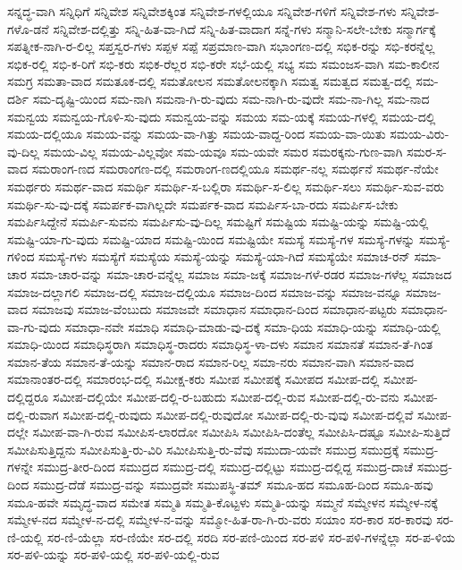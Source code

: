 {ಸನ್ನದ್ಧ-ವಾಗಿ
ಸನ್ನಿಧಿಗೆ
ಸನ್ನಿವೇಶ
ಸನ್ನಿವೇಶಕ್ಕಿಂತ
ಸನ್ನಿವೇಶ-ಗಳಲ್ಲಿಯೂ
ಸನ್ನಿವೇಶ-ಗಳಿಗೆ
ಸನ್ನಿವೇಶ-ಗಳು
ಸನ್ನಿವೇಶ-ಗಳೊ-ಡನೆ
ಸನ್ನಿವೇಶ-ದಲ್ಲಿತ್ತು
ಸನ್ನಿ-ಹಿತ-ವಾ-ಗಿದೆ
ಸನ್ನಿ-ಹಿತ-ವಾದಾಗ
ಸನ್ನೆ-ಗಳು
ಸನ್ಮಾನಿ-ಸಲೇ-ಬೇಕು
ಸನ್ಮಾರ್ಗಕ್ಕೆ
ಸಪತ್ನೀಕ-ನಾಗಿ-ರ-ಲಿಲ್ಲ
ಸಪ್ತಸ್ವರ-ಗಳು
ಸಪ್ಪಳ
ಸಪ್ಪೆ
ಸಪ್ರಮಾಣ-ವಾಗಿ
ಸಭಾಂಗಣ-ದಲ್ಲಿ
ಸಭಿಕ-ರನ್ನು
ಸಭಿ-ಕರನ್ನೆಲ್ಲ
ಸಭಿಕ-ರಲ್ಲಿ
ಸಭಿ-ಕ-ರಿಗೆ
ಸಭಿ-ಕರು
ಸಭಿಕ-ರೆಲ್ಲರ
ಸಭಿ-ಕರೇ
ಸಭೆ-ಯಲ್ಲಿ
ಸಭ್ಯ
ಸಮ
ಸಮಂಜಸ-ವಾಗಿ
ಸಮ-ಕಾಲೀನ
ಸಮಗ್ರ
ಸಮತಾ-ವಾದ
ಸಮತೂಕ-ದಲ್ಲಿ
ಸಮತೋಲನ
ಸಮತೋಲನಕ್ಕಾಗಿ
ಸಮತ್ವ
ಸಮತ್ವದ
ಸಮತ್ವ-ದಲ್ಲಿ
ಸಮ-ದರ್ಶಿ
ಸಮ-ದೃಷ್ಟಿ-ಯಿಂದ
ಸಮ-ನಾಗಿ
ಸಮನಾ-ಗಿ-ರು-ವುದು
ಸಮ-ನಾಗಿ-ರು-ವುದೇ
ಸಮ-ನಾ-ಗಿಲ್ಲ
ಸಮ-ನಾದ
ಸಮನ್ವಯ
ಸಮನ್ವಯ-ಗೊಳಿ-ಸು-ವುದು
ಸಮನ್ವಯ-ವನ್ನು
ಸಮಯ
ಸಮ-ಯಕ್ಕೆ
ಸಮಯ-ಗಳಲ್ಲಿ
ಸಮಯ-ದಲ್ಲಿ
ಸಮಯ-ದಲ್ಲಿಯೂ
ಸಮಯ-ವನ್ನು
ಸಮಯ-ವಾ-ಗಿತ್ತು
ಸಮಯ-ವಾದ್ದ-ರಿಂದ
ಸಮಯ-ವಾ-ಯಿತು
ಸಮಯ-ವಿರು-ವು-ದಿಲ್ಲ
ಸಮಯ-ವಿಲ್ಲ
ಸಮಯ-ವಿಲ್ಲವೋ
ಸಮ-ಯವೂ
ಸಮ-ಯವೇ
ಸಮರ
ಸಮರಕ್ಕನು-ಗುಣ-ವಾಗಿ
ಸಮರ-ಸ-ವಾದ
ಸಮರಾಂಗ-ಣದ
ಸಮರಾಂಗಣ-ದಲ್ಲಿ
ಸಮರಾಂಗ-ಣದಲ್ಲಿಯೂ
ಸಮರ್ಥ-ನಲ್ಲ
ಸಮರ್ಥನೆ
ಸಮರ್ಥ-ನೆಯೇ
ಸಮರ್ಥರು
ಸಮರ್ಥ-ವಾದ
ಸಮರ್ಥಿ
ಸಮರ್ಥಿ-ಸ-ಬಲ್ಲಿರಾ
ಸಮರ್ಥಿ-ಸ-ಲಿಲ್ಲ
ಸಮರ್ಥಿ-ಸಲು
ಸಮರ್ಥಿ-ಸುವ-ವರು
ಸಮರ್ಥಿ-ಸು-ವು-ದಕ್ಕೆ
ಸಮರ್ಪಕ-ವಾಗಿಲ್ಲದೇ
ಸಮರ್ಪಕ-ವಾದ
ಸಮರ್ಪಿಸ-ಬಾ-ರದು
ಸಮರ್ಪಿಸ-ಬೇಕು
ಸಮರ್ಪಿಸಿದ್ದೇನೆ
ಸಮರ್ಪಿ-ಸುವನು
ಸಮರ್ಪಿಸು-ವು-ದಿಲ್ಲ
ಸಮಷ್ಟಿಗೆ
ಸಮಷ್ಟಿಯ
ಸಮಷ್ಟಿ-ಯನ್ನು
ಸಮಷ್ಟಿ-ಯಲ್ಲಿ
ಸಮಷ್ಟಿ-ಯಾ-ಗು-ವುದು
ಸಮಷ್ಟಿ-ಯಾದ
ಸಮಷ್ಟಿ-ಯಿಂದ
ಸಮಷ್ಟಿಯೇ
ಸಮಸ್ಯೆ
ಸಮಸ್ಯೆ-ಗಳ
ಸಮಸ್ಯೆ-ಗಳನ್ನು
ಸಮಸ್ಯೆ-ಗಳಿಂದ
ಸಮಸ್ಯೆ-ಗಳು
ಸಮಸ್ಯೆಗೆ
ಸಮಸ್ಯೆಯ
ಸಮಸ್ಯೆ-ಯನ್ನು
ಸಮಸ್ಯೆ-ಯಾ-ಗಿದೆ
ಸಮಸ್ಯೆಯೇ
ಸಮಾಚ-ರನ್
ಸಮಾ-ಚಾರ
ಸಮಾ-ಚಾರ-ವನ್ನು
ಸಮಾ-ಚಾರ-ವನ್ನೆಲ್ಲ
ಸಮಾಜ
ಸಮಾ-ಜಕ್ಕೆ
ಸಮಾಜ-ಗಳೆ-ರಡರ
ಸಮಾಜ-ಗಳೆಲ್ಲ
ಸಮಾಜದ
ಸಮಾಜ-ದಲ್ಲಾಗಲಿ
ಸಮಾಜ-ದಲ್ಲಿ
ಸಮಾಜ-ದಲ್ಲಿಯೂ
ಸಮಾಜ-ದಿಂದ
ಸಮಾಜ-ವನ್ನು
ಸಮಾಜ-ವನ್ನೂ
ಸಮಾಜ-ವಾದ
ಸಮಾಜವು
ಸಮಾಜ-ವೆಂಬುದು
ಸಮಾಜವೇ
ಸಮಾಧಾನ
ಸಮಾಧಾನ-ದಿಂದ
ಸಮಾಧಾನ-ಪಟ್ಟರು
ಸಮಾಧಾನ-ವಾ-ಗು-ವುದು
ಸಮಾಧಾ-ನವೇ
ಸಮಾಧಿ
ಸಮಾಧಿ-ಮಾಡು-ವು-ದಕ್ಕೆ
ಸಮಾ-ಧಿಯ
ಸಮಾಧಿ-ಯನ್ನು
ಸಮಾಧಿ-ಯಲ್ಲಿ
ಸಮಾಧಿ-ಯಿಂದ
ಸಮಾಧಿಸ್ಥರಾಗಿ
ಸಮಾಧಿಸ್ಥ-ರಾದರು
ಸಮಾಧಿಸ್ಥ-ಳಾ-ದಳು
ಸಮಾನ
ಸಮಾನತೆ
ಸಮಾನ-ತೆ-ಗಿಂತ
ಸಮಾನ-ತೆಯ
ಸಮಾನ-ತೆ-ಯನ್ನು
ಸಮಾನ-ರಾದ
ಸಮಾನ-ರಿಲ್ಲ
ಸಮಾ-ನರು
ಸಮಾನ-ವಾಗಿ
ಸಮಾನ-ವಾದ
ಸಮಾನಾಂತರ-ದಲ್ಲಿ
ಸಮಾರಂಭ-ದಲ್ಲಿ
ಸಮೀಕ್ಷ-ಕರು
ಸಮೀಪ
ಸಮೀಪಕ್ಕೆ
ಸಮೀಪದ
ಸಮೀಪ-ದಲ್ಲಿ
ಸಮೀಪ-ದಲ್ಲಿದ್ದರೂ
ಸಮೀಪ-ದಲ್ಲಿಯೇ
ಸಮೀಪ-ದಲ್ಲಿ-ರ-ಬಹುದು
ಸಮೀಪ-ದಲ್ಲಿ-ರುವ
ಸಮೀಪ-ದಲ್ಲಿ-ರು-ವನು
ಸಮೀಪ-ದಲ್ಲಿ-ರುವಾಗ
ಸಮೀಪ-ದಲ್ಲಿ-ರುವುದು
ಸಮೀಪ-ದಲ್ಲಿ-ರುವುದೋ
ಸಮೀಪ-ದಲ್ಲಿ-ರು-ವುವು
ಸಮೀಪ-ದಲ್ಲಿವೆ
ಸಮೀಪ-ದಲ್ಲೇ
ಸಮೀಪ-ವಾ-ಗಿ-ರುವ
ಸಮೀಪಿಸ-ಲಾರದೋ
ಸಮೀಪಿಸಿ
ಸಮೀಪಿಸಿ-ದಂತೆಲ್ಲ
ಸಮೀಪಿಸಿ-ದಷ್ಟೂ
ಸಮೀಪಿ-ಸುತ್ತಿದೆ
ಸಮೀಪಿಸುತ್ತಿದ್ದನು
ಸಮೀಪಿಸುತ್ತಿ-ರು-ವಿರಿ
ಸಮೀಪಿಸುತ್ತಿ-ರು-ವೆವು
ಸಮುದಾ-ಯವೇ
ಸಮುದ್ರ
ಸಮುದ್ರಕ್ಕೆ
ಸಮುದ್ರ-ಗಳನ್ನೇ
ಸಮುದ್ರ-ತೀರ-ದಿಂದ
ಸಮುದ್ರದ
ಸಮುದ್ರ-ದಲ್ಲಿ
ಸಮುದ್ರ-ದಲ್ಲಿಟ್ಟು
ಸಮುದ್ರ-ದಲ್ಲಿದ್ದ
ಸಮುದ್ರ-ದಾಚೆ
ಸಮುದ್ರ-ದಿಂದ
ಸಮುದ್ರ-ದೆಡೆ
ಸಮುದ್ರ-ವನ್ನು
ಸಮುದ್ರವೇ
ಸಮುಪಸ್ಥಿ-ತಮ್
ಸಮೂ-ಹದ
ಸಮೂಹ-ದಿಂದ
ಸಮೂ-ಹವು
ಸಮೂ-ಹವೇ
ಸಮೃದ್ಧ-ವಾದ
ಸಮೇತ
ಸಮ್ಮತಿ
ಸಮ್ಮತಿ-ಕೊಟ್ಟಳು
ಸಮ್ಮತಿ-ಯನ್ನು
ಸಮ್ಮನೆ
ಸಮ್ಮೇಳನ
ಸಮ್ಮೇಳ-ನಕ್ಕೆ
ಸಮ್ಮೇಳ-ನದ
ಸಮ್ಮೇಳ-ನ-ದಲ್ಲಿ
ಸಮ್ಮೇಳ-ನ-ವನ್ನು
ಸಮ್ಮೋ-ಹಿತ-ರಾ-ಗಿ-ರು-ವರು
ಸಯಾಂ
ಸರ-ಕಾರ
ಸರ-ಕಾರವು
ಸರ-ಣಿ-ಯಲ್ಲಿ
ಸರ-ಣಿ-ಯೆಲ್ಲಾ
ಸರ-ಣಿಯೇ
ಸರ-ದಲ್ಲಿ
ಸರದಿ
ಸರ-ಪಣಿ-ಯಿಂದ
ಸರ-ಪಳಿ
ಸರ-ಪಳಿ-ಗಳನ್ನೆಲ್ಲಾ
ಸರ-ಪ-ಳಿಯ
ಸರ-ಪಳಿ-ಯನ್ನು
ಸರ-ಪಳಿ-ಯಲ್ಲಿ
ಸರ-ಪಳಿ-ಯಲ್ಲಿ-ರುವ
}
